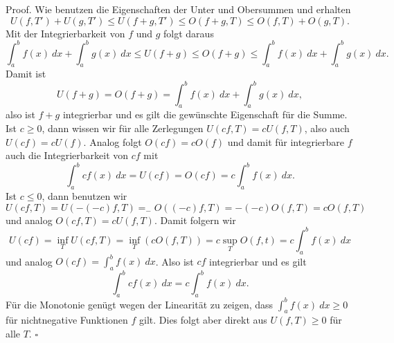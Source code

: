 \documentclass[letterpaper,10pt,english]{jupyterBook}
\begin{document}
\begin{emphBox}{}{}
Proof. Wie benutzen die Eigenschaften der Unter  und Obersummen und erhalten
\begin{equation*}
 U(f,T') + U(g,T') \leq U(f+g,T') \leq O(f+g,T) \leq O(f,T) + O(g,T) .
\end{equation*}
Mit der Integrierbarkeit von \(f\) und \(g\) folgt daraus
\begin{equation*}
 \int_a^b f(x)~dx + \int_a^b g(x)~dx \leq U(f+g) \leq O(f+g) \leq \int_a^b f(x)~dx + \int_a^b g(x)~dx.
\end{equation*}
Damit ist
\begin{equation*}
 U(f+g) = O(f+g) = \int_a^b f(x)~dx + \int_a^b g(x)~dx,
\end{equation*}
also ist \(f+g\) integrierbar und es gilt die gewünschte Eigenschaft für die Summe.
Ist \(c \geq 0\), dann wissen wir für alle Zerlegungen
\( U(cf,T) = c U(f,T)\), also auch \(U(cf) = c U(f)\). Analog folgt \(O(cf) = c O(f)\) und damit für integrierbare \(f\) auch die
Integrierbarkeit von \(c f\) mit
\begin{equation*}
  \int_a^b c f(x)~dx = U(cf) = O(cf) = c  \int_a^b f(x)~dx.
\end{equation*}
Ist \(c \leq 0\), dann benutzen wir
\begin{equation*}
 U(cf,T) = U(-(-c)f,T) = _- O((-c)f,T) = - (-c) O(f,T) = c O(f,T)
\end{equation*}
und analog \(O(cf,T) = c U(f,T)\). Damit folgern wir
\begin{equation*}
 U(cf) = \inf_T U(cf,T) = \inf_T (c O(f,T)) = c \sup_T O(f,t) = c \int_a^b f(x)~dx
\end{equation*}
und analog \(O(cf) = \int_a^b f(x)~dx \). Also ist \(cf\) integrierbar und es gilt
\begin{equation*}
  \int_a^b c f(x)~dx = c \int_a^b f(x)~dx.
\end{equation*}
Für die Monotonie genügt wegen der Linearität zu zeigen, dass \(\int_a^b f(x)~dx \geq 0\) für nichtnegative Funktionen \(f\) gilt. Dies folgt aber direkt aus \(U(f,T) \geq 0\) für alle \(T\). \(\square\)
\end{emphBox}
\end{document}
